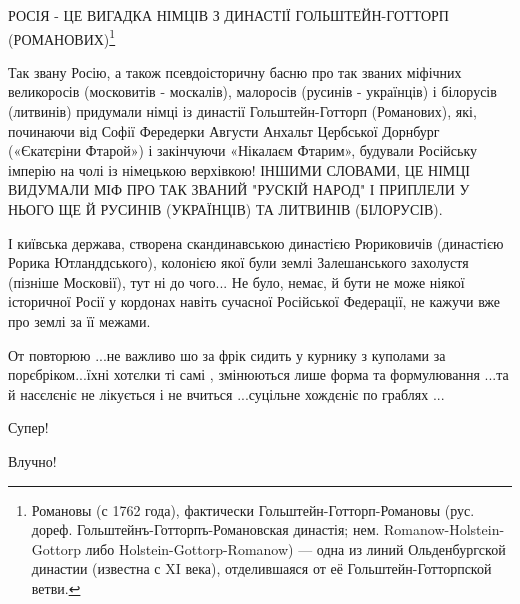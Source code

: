 \begin{itemize}
РОСІЯ - ЦЕ ВИГАДКА НІМЦІВ З ДИНАСТІЇ ГОЛЬШТЕЙН-ГОТТОРП (РОМАНОВИХ)\footnote{%
Романовы (с 1762 года), фактически Гольштейн-Готторп-Романовы (рус. дореф.
Гольштейнъ-Готторпъ-Романовская династія; нем. Romanow-Holstein-Gottorp либо
Holstein-Gottorp-Romanow) — одна из линий Ольденбургской династии (известна с
XI века), отделившаяся от её Гольштейн-Готторпской ветви.
}

Так звану Росію, а також псевдоісторичну басню про так званих міфічних
великоросів (московитів - москалів), малоросів (русинів - українців) і
білорусів (литвинів) придумали німці із династії Гольштейн-Готторп (Романових),
які, починаючи від Софії Фередерки Августи Анхальт Цербської Дорнбург
(«Єкатєріни Фтарой») і закінчуючи «Нікалаєм Фтарим», будували Російську імперію
на чолі із німецькою верхівкою! ІНШИМИ СЛОВАМИ, ЦЕ НІМЦІ ВИДУМАЛИ МІФ ПРО ТАК
ЗВАНИЙ "РУСКІЙ НАРОД" І ПРИПЛЕЛИ У НЬОГО ЩЕ Й РУСИНІВ (УКРАЇНЦІВ) ТА ЛИТВИНІВ
(БІЛОРУСІВ). 

І київська держава, створена скандинавською династією Рюриковичів (династією
Рорика Ютланддського), колонією якої були землі Залешанського захолустя
(пізніше Московії), тут ні до чого... Не було, немає, й бути не може ніякої
історичної Росії у кордонах навіть сучасної Російської Федерації, не кажучи вже
про землі за її межами.

 

От повторюю ...не важливо шо за фрік сидить у курнику з куполами за
порєбріком...їхні хотєлки ті самі , змінюються лише форма та формулювання ...та
й насєлєніє не лікується і не вчиться ...суцільне хождєніє по граблях ...


 
Супер!

 
Влучно!


\end{itemize}
